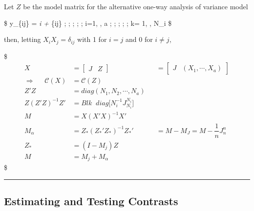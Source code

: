 \documentclass[
]{book}
\begin{document}
{{{Let \(Z\) be the model matrix for the alternative one-way analysis of variance model

\$
y\_\{ij\} = \mu\emph{i + \epsilon}\{ij\} ; ; ; ; ; i=1, \cdots, a ; ; ; ; ; k= 1, \cdots, N\_i
\$

then, letting \(X_i X_j = \delta_{ij}\) with 1 for \(i=j\) and 0 for \(i \not = j\),

\$
\begin{align}

X &= \begin{bmatrix}J & Z\end{bmatrix} &&= \begin{bmatrix}J & (X_1 , \cdots, X_a)\end{bmatrix}

\\

\Longrightarrow \; \; \; \; \; \mathcal{C}(X) &=\mathcal{C}(Z)

\\

Z'Z &= diag(N_1 , N_2 , \cdots, N_a)

\\

Z(Z'Z)^{-1}Z' &=Blk \; \; diag \Big[ N_i^{-1} J_{N_i}^{N_i} \Big]

\\

M &=X (X'X)^{-1}X'

\\

M_\alpha &= Z_\ast(Z_\ast ' Z_\ast)^{-1} Z_\ast ' &&=M- M_J = M-\dfrac{1}{n}J_n^n

\\

Z_\ast &=(I-M_j)Z

\\

M &= M_j + M_\alpha



\end{align}
\$

\begin{center}\rule{0.5\linewidth}{0.5pt}\end{center}

\hypertarget{estimating-and-testing-contrasts}{%
\subsection{Estimating and Testing Contrasts}\label{estimating-and-testing-contrasts}}

}}}
\end{document}
